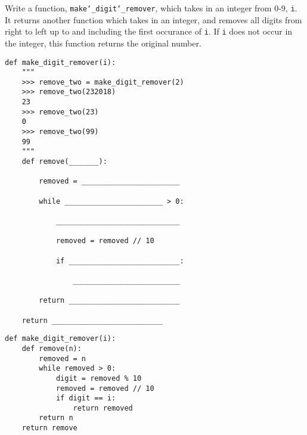 \begin{blocksection}
\question Write a function, \texttt{make\char`_digit\char`_remover}, which takes in an integer from 0-9, \texttt{i}. It returns another function which takes in an integer, and removes all digits from right to left up to and including the first occurance of \texttt{i}. If \texttt{i} does not occur in the integer, this function returns the original number. \\

\begin{lstlisting}
def make_digit_remover(i):
    """
    >>> remove_two = make_digit_remover(2)
    >>> remove_two(232018)
    23
    >>> remove_two(23)
    0
    >>> remove_two(99)
    99
    """
    def remove(_______):

    	removed = _______________________

        while _______________________ > 0:

            _____________________________

            removed = removed // 10

            if __________________________:

                _________________________

        return __________________________

    return __________________________
\end{lstlisting}

\begin{solution}
\begin{lstlisting}
def make_digit_remover(i):
    def remove(n):
        removed = n
        while removed > 0:
            digit = removed % 10
            removed = removed // 10
            if digit == i:
                return removed
        return n
    return remove
\end{lstlisting}
\end{solution}
\end{blocksection}
